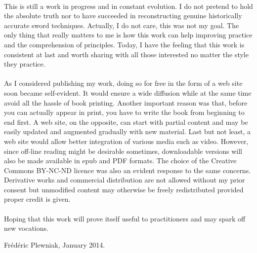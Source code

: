 \paragraph*{}
This is still a work in progress and in constant evolution.
I do not pretend to hold the absolute truth nor to have succeeded in
reconstructing genuine historically accurate \Taiji{} sword techniques.
Actually, I do not care, this was not my goal.
The only thing that really matters to me is how this work can help improving \Taijijian{} practice and the comprehension of \Taiji{} principles.
Today, I have the feeling that this work is consistent at last and worth sharing with all those interested no matter the style they practice.

\paragraph*{}
As I considered publishing my work, doing so for free in the form of a
web site soon became self-evident.
It would ensure a wide diffusion while at the same time avoid all the hassle of book printing.
Another important reason was that, before you can actually appear in print, you have to write the book from beginning to end first.
A web site, on the opposite, can start with partial content and may be easily updated and augmented gradually with new material.
Last but not least, a web site would allow better integration of various media such as video.
However, since off-line reading might be desirable sometimes, downloadable
versions will also be made available in epub and PDF formats.
The choice of the Creative Commons BY-NC-ND licence was also an evident response to the same concerns.
Derivative works and commercial distribution are not allowed without my prior consent but unmodified content may otherwise be freely redistributed provided proper credit is given.

\paragraph*{}
Hoping that this work will prove itself useful to practitioners and may
spark off new vocations.

\begin{flushright}
Fr\'{e}d\'{e}ric Plewniak, January 2014.
\end{flushright}
